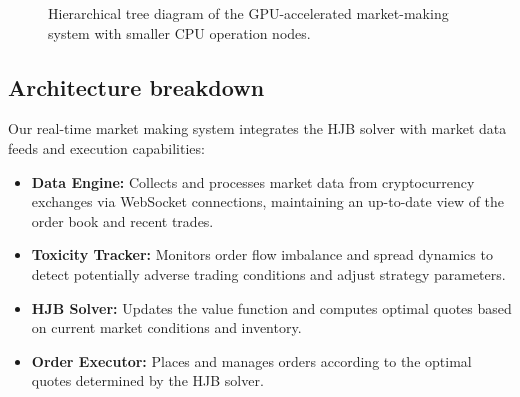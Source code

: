 \documentclass[twocolumn,11pt]{IEEEtran}  %
\begin{document}
\begin{onecolumn}
\begin{onecolumn}
\begin{figure}[h]
\centering
{}
\caption{Hierarchical tree diagram of the GPU-accelerated market-making system with smaller CPU operation nodes.}
\label{fig:tree}
\end{figure}

\subsection{Architecture breakdown}

Our real-time market making system integrates the HJB solver with market data feeds and execution capabilities:

\begin{itemize}
    \item \textbf{Data Engine:} Collects and processes market data from cryptocurrency exchanges via WebSocket connections, maintaining an up-to-date view of the order book and recent trades.
    
    \item \textbf{Toxicity Tracker:} Monitors order flow imbalance and spread dynamics to detect potentially adverse trading conditions and adjust strategy parameters.
    
    \item \textbf{HJB Solver:} Updates the value function and computes optimal quotes based on current market conditions and inventory.
    
    \item \textbf{Order Executor:} Places and manages orders according to the optimal quotes determined by the HJB solver.
    

\end{itemize}
\end{onecolumn}
\end{onecolumn}
\end{document}
